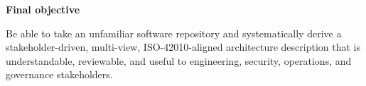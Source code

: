 \documentclass[10pt,letterpaper]{article}
\begin{document}
\vfill
\begin{tcolorbox}[
  enhanced,
  colback=Navy,
  colframe=Navy,
  boxrule=0pt,
  arc=2pt,
  left=12pt,right=12pt,top=10pt,bottom=10pt]
{\color{white}\bfseries Final objective}\par
{\color{white!90}Be able to take an unfamiliar software repository and systematically derive a stakeholder-driven, multi-view, ISO-42010-aligned architecture description that is understandable, reviewable, and useful to engineering, security, operations, and governance stakeholders.}
\end{tcolorbox}
\end{document}
